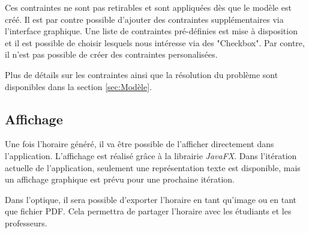 Ces contraintes ne sont pas retirables et sont appliquées dès que le modèle est créé. Il est par contre possible d'ajouter des contraintes supplémentaires via l'interface graphique. Une liste de contraintes pré-définies est mise à disposition et il est possible de choisir lesquels nous intéresse via des "Checkbox". Par contre, il n'est pas possible de créer des contraintes personalisées.

Plus de détails sur les contraintes ainsi que la résolution du problème sont disponibles dans la section \ref{sec:Modèle}.

\subsection{Affichage}

Une fois l'horaire généré, il va être possible de l'afficher directement dans l'application. L'affichage est réalisé grâce à la librairie \textit{JavaFX}. Dans l'itération actuelle de l'application, seulement une représentation texte est disponible, mais un affichage graphique est prévu pour une prochaine itération.

Dans l'optique, il sera possible d'exporter l'horaire en tant qu'image ou en tant que fichier PDF. Cela permettra de partager l'horaire avec les étudiants et les professeurs.

